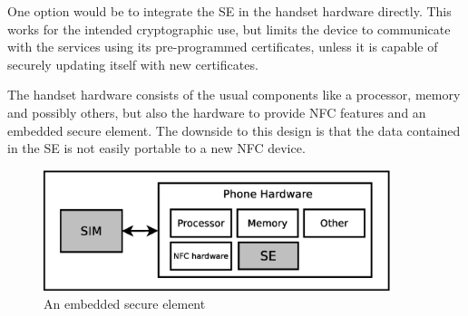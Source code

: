 \begin{enumerate}

\begin{item}
One option would be to integrate the SE in the handset hardware directly.
This works for the intended cryptographic use, but limits the device to communicate with the services using its pre-programmed certificates, unless it is capable of securely updating itself with new certificates.


The handset hardware consists of the usual components like a processor, memory and possibly others, but also the hardware to provide NFC features and an embedded secure element.
The downside to this design is that the data contained in the SE is not easily portable to a new NFC device.

\begin{figure}
\includegraphics[width=0.9\textwidth]{images/phone_with_SE_nokia}
\caption[Handset with embedded Secure Element]
{
An embedded secure element
}
\label{fig:integrated_se}
\end{figure}
\end{item}



\end{enumerate}
